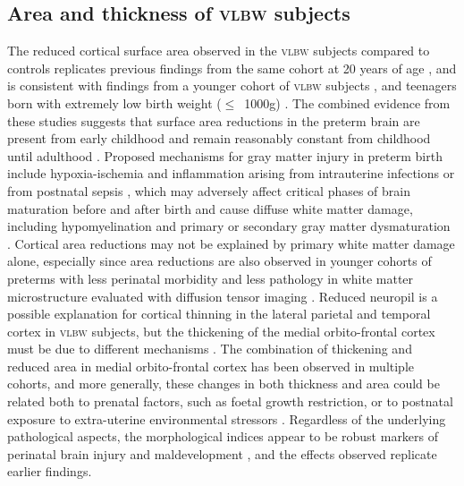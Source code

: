 \subsection{Area and thickness of \textsc{vlbw} subjects}

The reduced cortical surface area observed in the \textsc{vlbw} subjects compared to controls replicates previous findings from the same cohort at 20 years of age \citep{Skranes2013}, and is consistent with findings from a younger cohort of \textsc{vlbw} subjects \citep{Solsnes2015}, and teenagers born with extremely low birth weight ($\leqslant$~1000g) \citep{Grunewaldt2014}. The combined evidence from these studies suggests that surface area reductions in the preterm brain are present from early childhood and remain reasonably constant from childhood until adulthood \citep{Rimol2016}. Proposed mechanisms for gray matter injury in preterm birth include hypoxia-ischemia and inflammation arising from intrauterine infections or from postnatal sepsis \citep{Volpe2009, Volpe2011}, which may adversely affect critical phases of brain maturation before and after birth and cause diffuse white matter damage, including hypomyelination and primary or secondary gray matter dysmaturation \citep{Hagberg2015}. Cortical area reductions may not be explained by primary white matter damage alone, especially since area reductions are also observed in younger cohorts of preterms with less perinatal morbidity and less pathology in white matter microstructure evaluated with diffusion tensor imaging \citep{Eikenes2011,Rimol2016}. Reduced neuropil is a possible explanation for cortical thinning in the lateral parietal and temporal cortex in \textsc{vlbw} subjects, but the thickening of the medial orbito-frontal cortex must be due to different mechanisms \citep{Marin-Padilla1997, Bjuland2013, Grunewaldt2014}. The combination of thickening and reduced area in medial orbito-frontal cortex has been observed in multiple cohorts, and more generally, these changes in both thickness and area could be related both to prenatal factors, such as foetal growth restriction, or to postnatal exposure to extra-uterine environmental stressors \citep{Solsnes2015, Rimol2016}. Regardless of the underlying pathological aspects, the morphological indices appear to be robust markers of perinatal brain injury and maldevelopment \citep{Raznahan2011, Skranes2013, Rimol2016}, and the effects observed replicate earlier findings.
